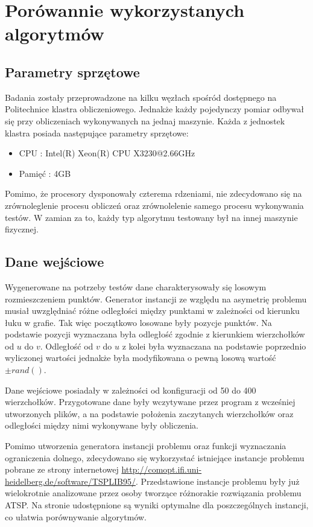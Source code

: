 \section{Porówannie wykorzystanych algorytmów}

\subsection{Parametry sprzętowe}

Badania zostały przeprowadzone na kilku węzłach spośród dostępnego na
Politechnice klastra obliczeniowego. Jednakże każdy pojedynczy pomiar
odbywał się przy obliczeniach wykonywanych na jednaj maszynie.
Każda z jednostek klastra posiada następujące parametry sprzętowe:
\begin{itemize}
 \item CPU : Intel(R) Xeon(R) CPU X3230@2.66GHz
 \item Pamięć : 4GB
\end{itemize}
Pomimo, że procesory dysponowały czterema rdzeniami, nie zdecydowano się
na zrównoleglenie procesu obliczeń oraz zrównolelenie samego procesu
wykonywania testów. W zamian za to, każdy typ algorytmu testowany był
na innej maszynie fizycznej.

\subsection{Dane wejściowe}

Wygenerowane na potrzeby testów dane charakterysowały się
losowym rozmieszczeniem punktów. Generator instancji ze względu na
asymetrię problemu musiał uwzględniać różne odległości między punktami
w zależności od kierunku łuku w grafie. Tak więc początkowo losowane były
pozycje punktów. Na podstawie pozycji wyznaczana była odległość
zgodnie z kierunkiem wierzchołków od $u$ do $v$. Odległość od $v$ do $u$
z kolei była wyznaczana na podstawie poprzednio wyliczonej wartości
jednakże była modyfikowana o pewną losową wartość $\pm rand()$.


Dane wejściowe posiadały w zależności od konfiguracji od 50 do 400
wierzchołków. Przygotowane dane były wczytywane przez program z wcześniej
utworzonych plików, a na podstawie położenia zaczytanych wierzchołków
oraz odległości między nimi wykonywane były  obliczenia.

Pomimo utworzenia generatora instancji problemu oraz funkcji wyznaczania
ograniczenia dolnego, zdecydowano się wykorzystać istniejące
instancje problemu pobrane ze strony internetowej
\url{http://comopt.ifi.uni-heidelberg.de/software/TSPLIB95/}. Przedstawione
instancje problemu były już wielokrotnie analizowane przez osoby
tworzące różnorakie rozwiązania problemu ATSP. Na stronie udostępnione
są wyniki optymalne dla poszczególnych instancji, co ułatwia porównywanie
algorytmów.

